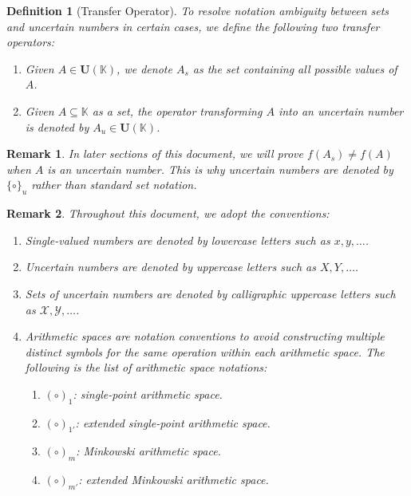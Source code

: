 \documentclass[a4paper,12pt,twoside]{memoir}
\newtheorem{definition}{Definition}[chapter]
\newtheorem{remark}{Remark}[chapter]
\newcommand{\tsbd}[1]{\mathbf{U}(\mathbb{#1})}
\newcommand{\kgdd}[1]{\left(#1\right)_1} %
\newcommand{\kgddmr}[1]{\left(#1\right)_{1'}} %
\newcommand{\kgdt}[1]{\left(#1\right)_m} %
\newcommand{\kgdtmr}[1]{\left(#1\right)_{m'}} %
\begin{document}
	\begin{definition}[Transfer Operator]
		To resolve notation ambiguity between sets and uncertain numbers in certain cases, we define the following two transfer operators:
		\begin{enumerate}[leftmargin=*]
			\item Given $A \in \tsbd{K}$, we denote $A_s$ as the set containing all possible values of $A$.
			\item Given $A \subseteq \mathbb{K}$ as a set, the operator transforming $A$ into an uncertain number is denoted by $A_u \in \tsbd{K}$.
		\end{enumerate}
	\end{definition}
	
	\begin{remark}
		In later sections of this document, we will prove $f(A_s) \neq f(A)$ when $A$ is an uncertain number. This is why uncertain numbers are denoted by $\{\circ\}_u$ rather than standard set notation.
	\end{remark}
	
	\begin{remark}
		Throughout this document, we adopt the conventions:
		\begin{enumerate}[leftmargin=*]
			\item Single-valued numbers are denoted by lowercase letters such as $x, y, \dots$.
			\item Uncertain numbers are denoted by uppercase letters such as $X, Y, \dots$.
			\item Sets of uncertain numbers are denoted by calligraphic uppercase letters such as $\mathcal{X}, \mathcal{Y}, \dots$.
			\item Arithmetic spaces are notation conventions to avoid constructing multiple distinct symbols for the same operation within each arithmetic space. The following is the list of arithmetic space notations:
			\begin{enumerate}[leftmargin=*]
				\item $\kgdd{\circ}$: single-point arithmetic space.
				\item $\kgddmr{\circ}$: extended single-point arithmetic space.
				\item $\kgdt{\circ}$: Minkowski arithmetic space.
				\item $\kgdtmr{\circ}$: extended Minkowski arithmetic space.
			\end{enumerate}
		\end{enumerate}
	\end{remark}
	
\end{document}
